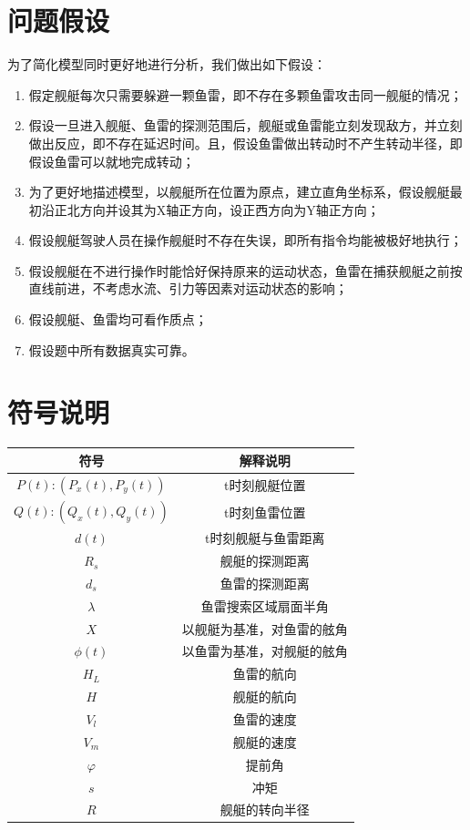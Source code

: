 \documentclass[12pt]{article}%
\begin{document}
\section{问题假设}
为了简化模型同时更好地进行分析，我们做出如下假设：
\begin{enumerate}[1.]\addtolength{\itemsep}{-1.5ex}
\item 假定舰艇每次只需要躲避一颗鱼雷，即不存在多颗鱼雷攻击同一舰艇的情况；
\item 假设一旦进入舰艇、鱼雷的探测范围后，舰艇或鱼雷能立刻发现敌方，并立刻做出反应，即不存在延迟时间。且，假设鱼雷做出转动时不产生转动半径，即假设鱼雷可以就地完成转动；
\item 为了更好地描述模型，以舰艇所在位置为原点，建立直角坐标系，假设舰艇最初沿正北方向并设其为X轴正方向，设正西方向为Y轴正方向；
\item 假设舰艇驾驶人员在操作舰艇时不存在失误，即所有指令均能被极好地执行；
\item 假设舰艇在不进行操作时能恰好保持原来的运动状态，鱼雷在捕获舰艇之前按直线前进，不考虑水流、引力等因素对运动状态的影响；
\item 假设舰艇、鱼雷均可看作质点；
\item 假设题中所有数据真实可靠。
\end{enumerate}
\section{符号说明}
\begin{table}[htbp]
  \centering
    \begin{tabular}{c|c}
    \hline
    符号 & 解释说明 \\
      \hline
    $P(t):(P_x(t),P_y(t))$  & t时刻舰艇位置 \\
      \hline
      $Q(t):(Q_x(t),Q_y(t))$ &t时刻鱼雷位置 \\
            \hline
      $d(t)$ &t时刻舰艇与鱼雷距离 \\
            \hline
      $R_s$ &舰艇的探测距离 \\
            \hline
      $d_s$ &鱼雷的探测距离 \\
            \hline
      $\lambda$ &鱼雷搜索区域扇面半角\\    
        \hline
      $X$ &以舰艇为基准，对鱼雷的舷角 \\
         \hline
      $\phi(t)$ &以鱼雷为基准，对舰艇的舷角\\
         \hline
      $H_L$ &鱼雷的航向\\
         \hline
      $H$ &舰艇的航向\\
         \hline
               $V_l$ &鱼雷的速度\\
         \hline
               $V_m$ &舰艇的速度\\
         \hline
         $\varphi$ &提前角\\
            \hline
                  $s$ &冲矩\\
         \hline
                        $R$ &舰艇的转向半径\\
         \hline
    \end{tabular}%
  \label{tab:addlabel}%
\end{table}%
\end{document}
